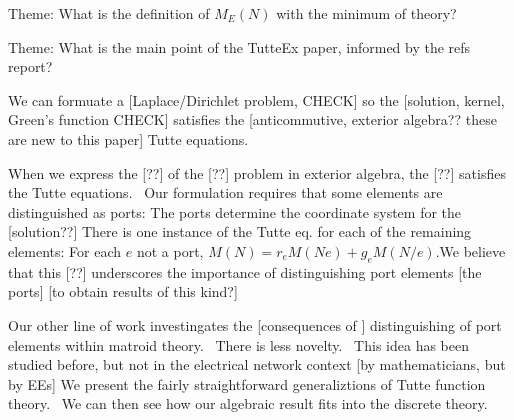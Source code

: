 \documentclass{letter}
\newenvironment{tmparmod}[3]{\begin{list}{}{\setlength{\topsep}{0pt}\setlength{\leftmargin}{#1}\setlength{\rightmargin}{#2}\setlength{\parindent}{#3}\setlength{\listparindent}{\parindent}\setlength{\itemindent}{\parindent}\setlength{\parsep}{\parskip}} \item[]}{\end{list}}
\begin{document}
\begin{tmparmod}{1in}{0pt}{0pt}
\begin{tmparmod}{1cm}{0pt}{0pt}
    Theme: What is the definition of $M_E (N)$ with the minimum of theory?
    
    Theme: What is the main point of the TutteEx paper, informed by the refs
    report?
    
    We can formuate a [Laplace/Dirichlet problem, CHECK] so the [solution,
    kernel, Green's function CHECK] satisfies the [anticommutive, exterior
    algebra?? these are new to this paper] Tutte equations.
    
    When we express the [??] of the [??] problem in exterior algebra, the [??]
    satisfies the Tutte equations. \ Our formulation requires that some
    elements are distinguished as ports: The ports determine the coordinate
    system for the [solution??] There is one instance of the Tutte eq. for
    each of the remaining elements: For each $e$ not a port, $M (N) = r_e M (N
    e) + g_e M (N / e) .$We believe that this [??] underscores the importance
    of distinguishing port elements [the ports] [to obtain results of this
    kind?]
    
    Our other line of work investingates the [consequences of ] distinguishing
    of port elements within matroid theory. \ There is less novelty. \ This
    idea has been studied before, but not in the electrical network context
    [by mathematicians, but by EEs] We present the fairly straightforward
    generaliztions of Tutte function theory. \ We can then see how our
    algebraic result fits into the discrete theory.
  \end{tmparmod}
\end{tmparmod}
\end{document}
